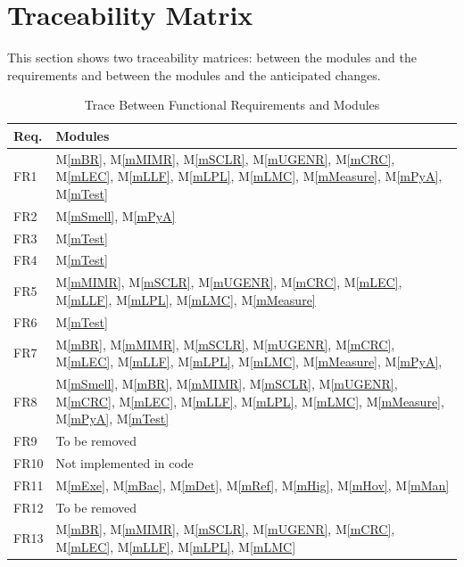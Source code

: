 \documentclass[12pt, titlepage]{article}
\newcommand{\mref}[1]{M\ref{#1}}
\begin{document}
\section{Traceability Matrix} \label{SecTM}

This section shows two traceability matrices: between the modules and the
requirements and between the modules and the anticipated changes.

\begin{table}[H]
  \centering
  \begin{tabular}{p{} p{}}
    \toprule
    \textbf{Req.} & \textbf{Modules}\\
    \midrule
    FR1 & \mref{mBR}, \mref{mMIMR}, \mref{mSCLR}, \mref{mUGENR}, \mref{mCRC}, \mref{mLEC}, \mref{mLLF}, \mref{mLPL}, \mref{mLMC}, \mref{mMeasure}, \mref{mPyA}, \mref{mTest}\\
    FR2 & \mref{mSmell}, \mref{mPyA}\\
    FR3 & \mref{mTest}\\
    FR4 & \mref{mTest}\\
    FR5 & \mref{mMIMR}, \mref{mSCLR}, \mref{mUGENR}, \mref{mCRC}, \mref{mLEC}, \mref{mLLF}, \mref{mLPL}, \mref{mLMC}, \mref{mMeasure}\\
    FR6 & \mref{mTest}\\
    FR7 & \mref{mBR}, \mref{mMIMR}, \mref{mSCLR}, \mref{mUGENR}, \mref{mCRC}, \mref{mLEC}, \mref{mLLF}, \mref{mLPL}, \mref{mLMC}, \mref{mMeasure}, \mref{mPyA},\\
    FR8 & \mref{mSmell}, \mref{mBR}, \mref{mMIMR}, \mref{mSCLR}, \mref{mUGENR}, \mref{mCRC}, \mref{mLEC}, \mref{mLLF}, \mref{mLPL}, \mref{mLMC}, \mref{mMeasure}, \mref{mPyA}, \mref{mTest}\\
    FR9 & To be removed\\
    FR10 & Not implemented in code\\
    FR11 & \mref{mExe}, \mref{mBac}, \mref{mDet}, \mref{mRef}, \mref{mHig}, \mref{mHov}, \mref{mMan}\\
    FR12 & To be removed\\
    FR13 & \mref{mBR}, \mref{mMIMR}, \mref{mSCLR}, \mref{mUGENR}, \mref{mCRC}, \mref{mLEC}, \mref{mLLF}, \mref{mLPL}, \mref{mLMC}\\
    \bottomrule
  \end{tabular}
  \caption{Trace Between Functional Requirements and Modules}
  \label{tab:fr-mod}
\end{table}
\end{document}
